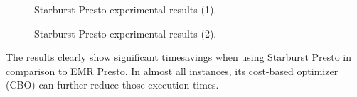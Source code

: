 \begin{figure}
   \begin{center}
   \end{center}
   \caption{Starburst Presto experimental results (1).}
   \label{fig:validationExperimentsStarburstGraph1}
\end{figure}

\begin{figure}
   \begin{center}
   \end{center}
   \caption{Starburst Presto experimental results (2).}
   \label{fig:validationExperimentsStarburstGraph2}
\end{figure}

The results clearly show significant timesavings when using Starburst Presto in comparison to EMR Presto. In almost all instances, its cost-based optimizer (CBO) can further reduce those execution times.

